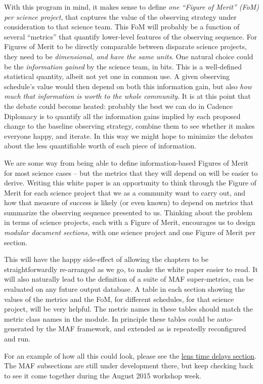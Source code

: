 With this program in mind, it makes sense to define {\it one ``Figure
of Merit'' (FoM) per science project}, that captures the value of  the
observing strategy under consideration to that science team. This FoM
will probably be a function of several ``metrics'' that quantify
lower-level features of the observing sequence.  For Figures of Merit
to be directly comparable between disparate science projects,  they
need to be {\it dimensional, and have the same units}. One natural
choice could be the {\it information gained} by the science team, in
bits. This is a well-defined statistical quantity, albeit not yet one
in common use. A given observing schedule's value would then depend on
both this information gain, but also {\it how much that information is
worth to the whole community}. It is at this point that the debate
could become heated: probably the best we can do in Cadence Diplomacy
is to quantify all the information gains implied by each proposed
change to the baseline  observing strategy, combine them to see
whether it makes everyone happy, and iterate. In this way we might
hope to minimize the debates about the less quantifiable worth of each
piece of information.

We are some way from being able to define information-based Figures of
Merit for most science cases -- but the metrics that they will depend
on will be easier to derive. Writing this white paper is an
opportunity to think through the Figure of Merit for each science
project that we as a community want to carry out, and how that measure
of success is likely (or even known) to depend on metrics that
summarize the observing sequence presented to us. Thinking about the
problem in terms of science projects, each with a  Figure of Merit,
encourages us to design {\it modular document
sections,} with one science project and one Figure of Merit per section.

This will have the happy side-effect of allowing the chapters to be
straightforwardly re-arranged as we go, to make the white paper easier
to read. It will also naturally lead to the definition of a suite of
MAF  super-metrics, can be evaluated on any future \OpSim output
database.  A table in each section showing the values of the metrics
and the FoM, for different schedules, for that science project, will
be very helpful. The metric names in these tables should match the
metric class names in the
\href{https://github.com/LSST-nonproject/sims_maf_contrib/wiki}{\simsMafContrib}
module. In principle these tables could be auto-generated by the MAF
framework, and extended as \OpSim is repeatedly reconfigured and run.

For an example of how all this could look, please see the
\hyperref[sec:lenstimedelays]{lens
time delays section}. The MAF subsections are still under development
there, but keep checking back to see it come together during the
August 2015 workshop week.
